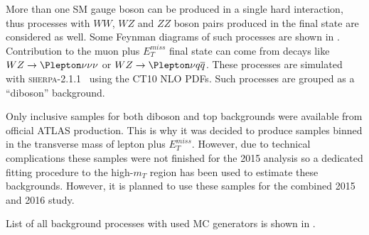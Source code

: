 More than one SM gauge boson can be produced in a single hard interaction, thus processes with $WW$, $WZ$ and $ZZ$ boson pairs produced in the final state are considered as well.
Some Feynman diagrams of such processes are shown in .
Contribution to the muon plus $E_T^{miss}$ final state can come from decays like $WZ \to \Plepton \nu \nu \nu$ or $WZ \to \Plepton \nu q \overline{q}$.
These processes are simulated with {\scshape sherpa-2.1.1}~\cite{Sherpa} using the CT10 NLO PDFs.
Such processes are grouped as a ``diboson'' background. 

Only inclusive samples for both diboson and top backgrounds were available from official ATLAS production. 
This is why it was decided to produce samples binned in the transverse mass of lepton plus $E_T^{miss}$.
However, due to technical complications these samples were not finished for the 2015 analysis 
so a dedicated fitting procedure to the high-$m_T$ region has been used to estimate these backgrounds.
However, it is planned to use these samples for the combined 2015 and 2016 study.

List of all background processes with used MC generators is shown in .

